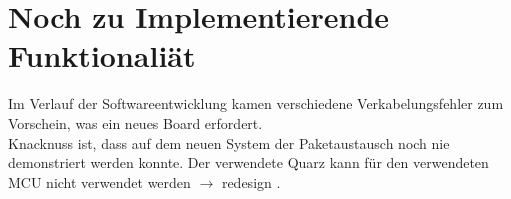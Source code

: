 \section{Noch zu Implementierende Funktionali\"at}
{\large\textbullet} Im Verlauf der Softwareentwicklung kamen verschiedene Verkabelungsfehler zum Vorschein, was ein neues Board erfordert.\\
{\large\textbullet} Knacknuss ist, dass auf dem neuen System der Paketaustausch noch nie demonstriert werden konnte.
{\large\textbullet} Der verwendete Quarz kann für den verwendeten MCU nicht verwendet werden $\rightarrow$ redesign .


 


